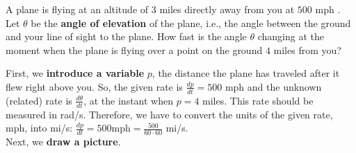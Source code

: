 \documentclass{ximera}
\begin{document}
	\author{Nela Lakos}
	\begin{example}
		A plane is flying at an altitude of $3$ miles directly away from you at $500$ mph 
		.  Let  $\theta$ be the \textbf{angle of elevation} of the plane, i.e., the angle between the ground and your line of  sight to the plane.
		How fast is the angle $\theta$  changing at
		the moment when the plane is flying over a point on the ground $4$
		miles from you?
		
		
		\begin{explanation}
			First, we \textbf{introduce a variable} $p$, the distance the plane has traveled after it flew right above you. 
			So, the given rate is $\frac{dp}{dt}=500$ mph and the unknown (related) rate is $\frac{d\theta}{dt}$, at the instant when $p=4$ miles.
			This rate should be measured in rad/s.
			Therefore, we have to convert the units of the given rate, mph, into mi/s:
			$\frac{dp}{dt}=500$mph$=\frac{500}{60\cdot60}$ mi/s. \\
			Next, we \textbf{draw a picture}.
			\begin{image}
\end{image}
\end{explanation}
\end{example}
\end{document}
